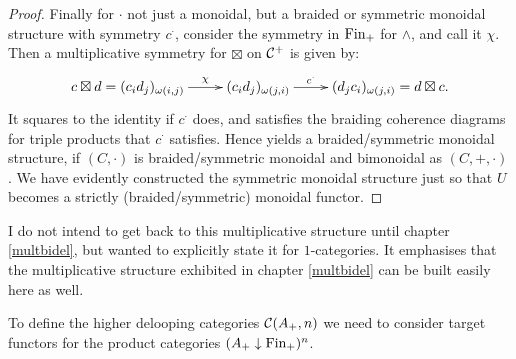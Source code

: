 {{\begin{proof}
	Finally for $\cdot$ not just a monoidal, but a braided or symmetric
	monoidal structure with symmetry $c^\cdot$, consider the symmetry 
	in $\mathrm{Fin}_+$ for $\wedge$, and call	it $\chi$. Then a multiplicative 
	symmetry for $\boxtimes$ on $\mathcal{C}^+$ is given	by:
	\[\xymatrix{c\boxtimes d = (c_id_j)_{\omega(i,j)} \ar[r]^-\chi
	& (c_id_j)_{\omega(j,i)} \ar[r]^-{c^\cdot} & (d_jc_i)_{\omega(j,i)}
	=d\boxtimes c.}\]
	It squares to the identity if $c^\cdot$ does, and satisfies the braiding
	coherence diagrams for triple products that $c^\cdot$ satisfies. Hence
	yields a braided/symmetric monoidal structure, if $(C,\cdot)$ is
	braided/symmetric monoidal and bimonoidal as $(C,+,\cdot)$.	We have
	evidently constructed the symmetric monoidal structure just so that
	$U$ becomes a strictly (braided/symmetric) monoidal functor.
	\end{proof}}}

I do not intend to get back to this multiplicative structure until chapter
\ref{multbidel}, but wanted to explicitly state it for $1$-categories.
It emphasises that the multiplicative structure exhibited in 
chapter \ref{multbidel} can be built easily here as well.

To define the higher delooping categories $\mathcal{C}(A_+,n)$ we need to consider
target functors for the product categories $(A_+\downarrow\mathrm{Fin}_+)^n$.
{}

